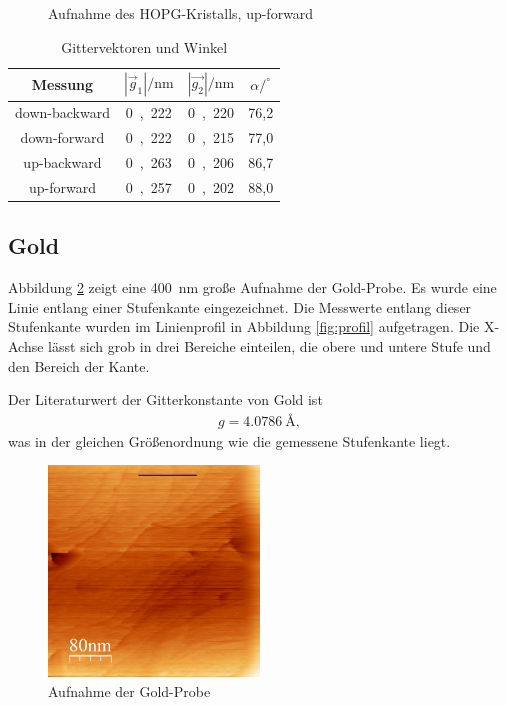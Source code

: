 \begin{figure}
	\centering
	\resizebox{12cm}{!}{
		
	}
	\caption{Aufnahme des HOPG-Kristalls, up-forward}
	\label{fig:up-forward}
\end{figure}

\begin{table}[H]
	\begin{center}
		\begin{tabular}{c c c c}
			\toprule
			Messung & $|\vec{g}_1| / \mathrm{nm}$ & $|\vec{g_2}| / \mathrm{nm}$ & $\alpha /^\circ $ \\
			\midrule
			down-backward & \si{0,222} & \si{0,220} & 76,2 \\
			down-forward & \si{0,222} & \si{0,215} & 77,0 \\
			up-backward & \si{0,263} & \si{0,206} & 86,7 \\
			up-forward & \si{0,257} & \si{0,202} & 88,0 \\
			\bottomrule
		\end{tabular}
		\caption{Gittervektoren und Winkel}
		\label{fig:t1}
	\end{center}
\end{table}

\subsection{Gold}

Abbildung \ref{fig:gold} zeigt eine \SI{400}{\nano \meter} große Aufnahme der Gold-Probe.
Es wurde eine Linie entlang einer Stufenkante eingezeichnet.
Die Messwerte entlang dieser Stufenkante wurden im Linienprofil in Abbildung \ref{fig:profil} aufgetragen.
Die X-Achse lässt sich grob in drei Bereiche einteilen, die obere und untere Stufe und den Bereich der Kante.

Der Literaturwert\cite{gold} der Gitterkonstante von Gold ist
\begin{align}
	g = \SI{4,0786}{\angstrom},
\end{align}
was in der gleichen Größenordnung wie die gemessene Stufenkante liegt.

\begin{figure}
	\centering
	\includegraphics[width=0.5\textwidth]{gold}
	\caption{Aufnahme der Gold-Probe}
	\label{fig:gold}
\end{figure}

